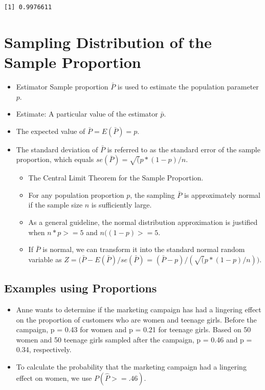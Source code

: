 \documentclass[
  letterpaper,
  DIV=11,
  numbers=noendperiod]{scrreprt}
\providecommand{\tightlist}{%
  \setlength{\itemsep}{0pt}\setlength{\parskip}{0pt}}\usepackage{longtable,booktabs,array}
\begin{document}
\begin{verbatim}
[1] 0.9976611
\end{verbatim}


\chapter{Sampling Distribution of the Sample
Proportion}\label{sampling-distribution-of-the-sample-proportion}

\begin{itemize}
\tightlist
\item
  Estimator Sample proportion \(\bar{P}\) is used to estimate the
  population parameter \(p\).
\item
  Estimate: A particular value of the estimator \(\bar{p}\).
\item
  The expected value of \(\bar{P}=E(\bar{P})=𝑝\).
\item
  The standard deviation of \(\bar{P}\) is referred to as the standard
  error of the sample proportion, which equals
  \(se(\bar{P}) = \sqrt(p*(1-p)/n\).

  \begin{itemize}
  \tightlist
  \item
    The Central Limit Theorem for the Sample Proportion.
  \item
    For any population proportion \(p\), the sampling \(\bar{P}\) is
    approximately normal if the sample size \(n\) is sufficiently large.
  \item
    As a general guideline, the normal distribution approximation is
    justified when \(n*p>=5\) and \(n((1-p)>=5\).
  \item
    If \(\bar{P}\) is normal, we can transform it into the standard
    normal random variable as \(Z=(\bar{P}-E(\bar{P})/se(\bar{P})\) =
    \((\bar{P}-p)/(\sqrt(p*(1-p)/n))\).
  \end{itemize}
\end{itemize}

\section{Examples using Proportions}\label{examples-using-proportions}

\begin{itemize}
\tightlist
\item
  Anne wants to determine if the marketing campaign has had a lingering
  effect on the proportion of customers who are women and teenage girls.
  Before the campaign, p = 0.43 for women and p = 0.21 for teenage
  girls. Based on 50 women and 50 teenage girls sampled after the
  campaign, p = 0.46 and p = 0.34, respectively.
\item
  To calculate the probability that the marketing campaign had a
  lingering effect on women, we use \(P(\hat{P} >= .46)\).
\end{itemize}
\end{document}
